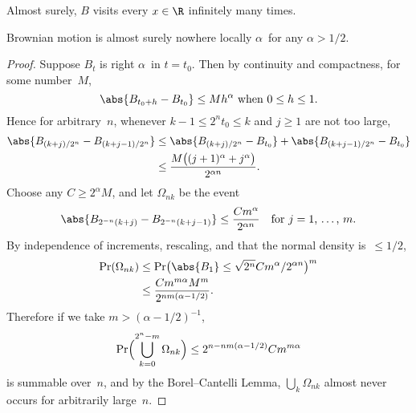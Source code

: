 \begin	{corollary}
Almost surely, $B$ visits every \( x \in \R \) infinitely many times.
\end	{corollary}

\begin	{theorem}
\label	{thm:nowhere-holder}
	Brownian motion is almost surely nowhere locally $\alpha$\dashHolder\
	for any \( \alpha > 1/2 \).
\end	{theorem}
\begin	{proof}
Suppose $B_t$ is right $\alpha$\dashHolder\ in \( t = t_0 \).
Then by continuity and compactness, for some number~$M$, \[
	\text{\( \abs{B_{t_0+h} - B_{t_0}} \le Mh^\alpha \)
		when \(0 \le h \le 1 \).}
\]
Hence for arbitrary~$n$,
whenever \( k-1 \le 2^n t_0 \le k \) and \( j \ge 1 \) are not too large,
\begin	{align*}
	\abs{ B_{(k+j)/2^n} - B_{(k+j-1)/2^n} }
	&\le	\abs{ B_{(k+j)/2^n} - B_{t_0} }
		+ \abs { B_{(k+j-1)/2^n} - B_{t_0} } \\
	&\le	\frac {M\bigl((j+1)^\alpha+j^\alpha\bigr)} {2^{\alpha n}}
	\text.
\end	{align*}
Choose any \( C \ge 2^\alpha M \), and let $\Omega_{nk}$ be the event \[
	\abs{ B_{2^{-n}(k+j)} - B_{2^{-n}(k+j-1)} } \le
		\frac {Cm^\alpha} {2^{\alpha n}}
	\quad \text{for \( j = 1 \), \dots,~$m$.}
\]
By independence of increments, rescaling,
and that the normal density is~\( \le 1/2 \),
\begin	{align*}
	\Pr(\Omega_{nk}) &\le \Pr\bigl(
		\abs{B_1} \le \sqrt{2^n} Cm^\alpha / 2^{\alpha n} \bigr)^m \\
	&\le	\frac {Cm^{m\alpha} M^m} {2^{nm(\alpha-1/2)}}
	\text.
\end	{align*}
Therefore if we take \( m > (\alpha-1/2)^{-1} \), \[
	\Pr\Bigl( \bigcup_{k=0}^{2^n-m} \Omega_{nk} \Bigr)
	\le 2^{n - nm(\alpha-1/2)} Cm^{m\alpha}
\] is summable over~$n$,
and by the Borel--Cantelli Lemma,
$\bigcup_k \Omega_{nk}$ almost never occurs for arbitrarily large~$n$.
\end	{proof}
